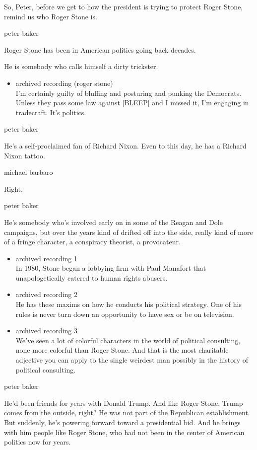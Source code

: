 So, Peter, before we get to how the president is trying to protect Roger
Stone, remind us who Roger Stone is.

peter baker

Roger Stone has been in American politics going back decades.

He is somebody who calls himself a dirty trickster.

\begin{itemize}
\tightlist
\item
  archived recording (roger stone)\\
  I'm certainly guilty of bluffing and posturing and punking the
  Democrats. Unless they pass some law against {[}BLEEP{]} and I missed
  it, I'm engaging in tradecraft. It's politics.
\end{itemize}

peter baker

He's a self-proclaimed fan of Richard Nixon. Even to this day, he has a
Richard Nixon tattoo.

michael barbaro

Right.

peter baker

He's somebody who's involved early on in some of the Reagan and Dole
campaigns, but over the years kind of drifted off into the side, really
kind of more of a fringe character, a conspiracy theorist, a
provocateur.

\begin{itemize}
\item
  archived recording 1\\
  In 1980, Stone began a lobbying firm with Paul Manafort that
  unapologetically catered to human rights abusers.
\item
  archived recording 2\\
  He has these maxims on how he conducts his political strategy. One of
  his rules is never turn down an opportunity to have sex or be on
  television.
\item
  archived recording 3\\
  We've seen a lot of colorful characters in the world of political
  consulting, none more colorful than Roger Stone. And that is the most
  charitable adjective you can apply to the single weirdest man possibly
  in the history of political consulting.
\end{itemize}

peter baker

He'd been friends for years with Donald Trump. And like Roger Stone,
Trump comes from the outside, right? He was not part of the Republican
establishment. But suddenly, he's powering forward toward a presidential
bid. And he brings with him people like Roger Stone, who had not been in
the center of American politics now for years.

